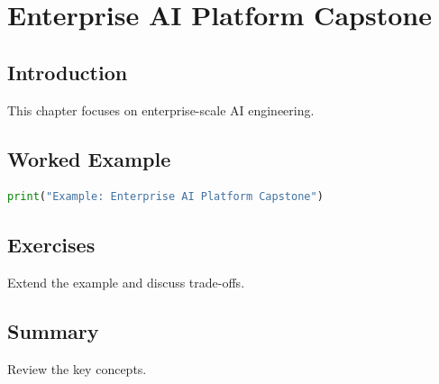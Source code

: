 \chapter{Enterprise AI Platform Capstone}
\label{chap:vol10-15}



\section{Introduction}
This chapter focuses on enterprise-scale AI engineering.

\section{Worked Example}
\begin{lstlisting}[language=Python]
print("Example: Enterprise AI Platform Capstone")
\end{lstlisting}

\section{Exercises}
\begin{exercise}
Extend the example and discuss trade-offs.
\end{exercise}

\section{Summary}
Review the key concepts.
